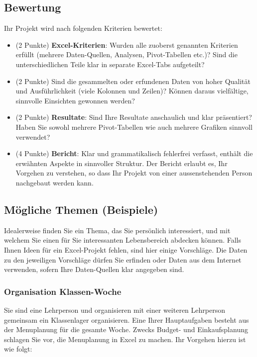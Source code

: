 \subsection*{Bewertung}

Ihr Projekt wird nach folgenden Kriterien bewertet:
\begin{itemize}
	\item (2 Punkte) \textbf{Excel-Kriterien}: Wurden alle zuoberst genannten Kriterien erfüllt (mehrere Daten-Quellen, Analysen, Pivot-Tabellen etc.)? Sind die unterschiedlichen Teile klar in separate Excel-Tabs aufgeteilt?
	\item (2 Punkte) Sind die gesammelten oder erfundenen Daten von hoher Qualität und Ausführlichkeit (viele Kolonnen und Zeilen)? Können daraus vielfältige, sinnvolle Einsichten gewonnen werden?
	\item (2 Punkte) \textbf{Resultate}: Sind Ihre Resultate anschaulich und klar präsentiert? Haben Sie sowohl mehrere Pivot-Tabellen wie auch mehrere Grafiken sinnvoll verwendet?
	\item (4 Punkte) \textbf{Bericht}: Klar und grammatikalisch fehlerfrei verfasst, enthält die erwähnten Aspekte in sinnvoller Struktur. Der Bericht erlaubt es, Ihr Vorgehen zu verstehen, so dass Ihr Projekt von einer aussenstehenden Person nachgebaut werden kann.
\end{itemize}

\newpage
\subsection*{Mögliche Themen (Beispiele)}

Idealerweise finden Sie ein Thema, das Sie persönlich interessiert, und mit welchem Sie einen für Sie interessanten Lebensbereich abdecken können. Falls Ihnen Ideen für ein Excel-Projekt fehlen, sind hier einige Vorschläge. Die Daten zu den jeweiligen Vorschläge dürfen Sie erfinden oder Daten aus dem Internet verwenden, sofern Ihre Daten-Quellen klar angegeben sind.

\subsubsection*{Organisation Klassen-Woche}
Sie sind eine Lehrperson und organisieren mit einer weiteren Lehrperson gemeinsam ein Klassenlager organisieren. Eine Ihrer Hauptaufgaben besteht aus der Menuplanung für die gesamte Woche. Zwecks Budget- und Einkaufsplanung schlagen Sie vor, die Menuplanung in Excel zu machen. Ihr Vorgehen hierzu ist wie folgt:

